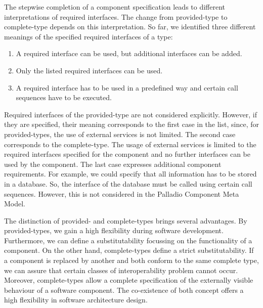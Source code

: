 The stepwise completion of a component specification leads to different interpretations of required interfaces. The change from provided-type to complete-type depends on this interpretation. So far, we identified three different meanings of the specified required interfaces of a type:
\begin{enumerate}
\item	A required interface can be used, but additional interfaces can be added.
\item	Only the listed required interfaces can be used.
\item	A required interface has to be used in a predefined way and certain call sequences have to be executed. 
\end{enumerate}

Required interfaces of the provided-type are not considered explicitly. However, if they are specified, their meaning corresponds to the first case in the list, since, for provided-types, the use of external services is not limited. The second case corresponds to the complete-type. The usage of external services is limited to the required interfaces specified for the component and no further interfaces can be used by the component. The last case expresses additional component requirements. For example, we could specify that all information has to be stored in a database. So, the interface of the database must be called using certain call sequences. However, this is not considered in the Palladio Component Meta Model.

The distinction of provided- and complete-types brings several advantages. By provided-types, we gain a high flexibility during software development. Furthermore, we can define a substitutability focussing on the functionality of a component. On the other hand, complete-types define a strict substitutability. If a component is replaced by another and both conform to the same complete type, we can assure that certain classes of interoperability problem cannot occur. Moreover, complete-types allow a complete specification of the externally visible behaviour of a software component. The co-existence of both concept offers a high flexibility in software architecture design.
